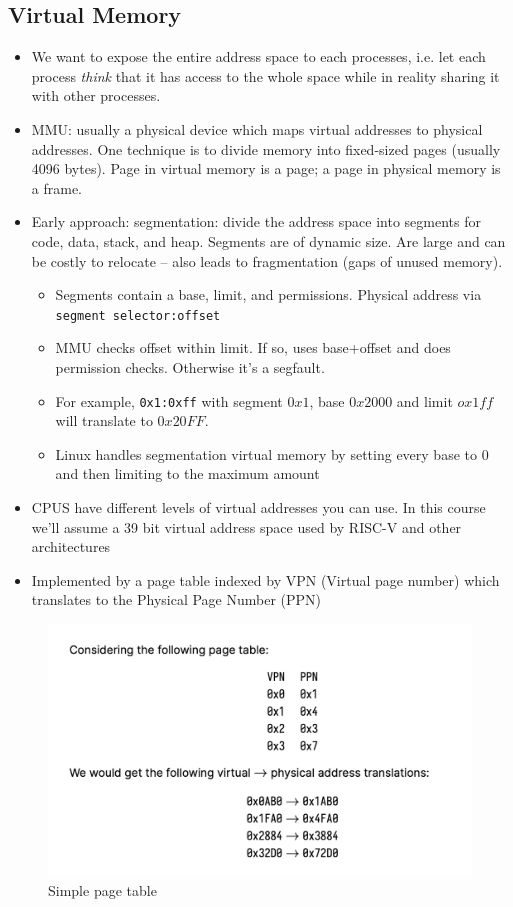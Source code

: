 \documentclass[../notes.tex]{subfiles}
\begin{document}
\subsection{Virtual Memory}
\begin{itemize}
    \item We want to expose the entire address space to each processes, i.e. let each process \textit{think} that it has access to the whole space while in reality sharing it with other processes.
    \item MMU: usually a physical device which maps virtual addresses to physical addresses. One technique is to divide memory into fixed-sized pages (usually 4096 bytes). Page in virtual memory is a page; a page in physical memory is a frame.
    \item Early approach: segmentation: divide the address space into segments for code, data, stack, and heap. Segments are of dynamic size. Are large and can be costly to relocate -- also leads to fragmentation (gaps of unused memory).
        \begin{itemize}
            \item Segments contain a base, limit, and permissions. Physical address via \texttt{segment selector:offset}
            \item MMU checks offset within limit. If so, uses base+offset and does permission checks. Otherwise it's a segfault.
            \item For example, \texttt{0x1:0xff} with segment $ 0x1 $, base $ 0x2000 $ and limit $ ox1ff $ will translate to $ 0x20FF $.
            \item Linux handles segmentation virtual memory by setting every base to 0 and then limiting to the maximum amount
        \end{itemize}
    \item CPUS have different levels of virtual addresses you can use. In this course we'll assume a 39 bit virtual address space used by RISC-V and other architectures
    \item Implemented by a page table indexed by VPN (Virtual page number) which translates to the Physical Page Number (PPN)
\end{itemize}


\begin{figure}[H]
    \centering
    \includegraphics[width=0.8\linewidth]{img/image_2023-02-06-15-31-33.png}
    \caption{Simple page table}
\end{figure}
\end{document}

